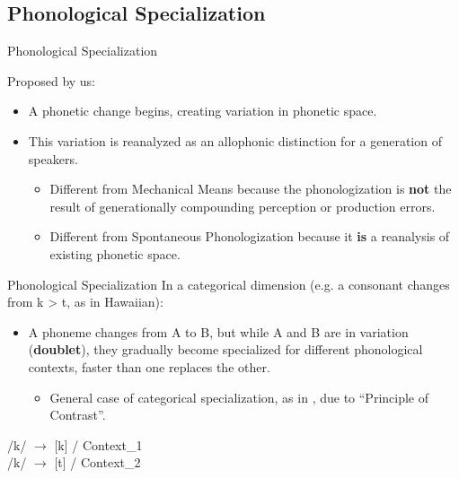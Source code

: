 \documentclass[hyperref={pdfpagelabels=false}]{beamer}
\begin{document}
\subsection{Phonological Specialization}

\begin{frame}{Phonological Specialization}

	Proposed by us: \pause
	\begin{itemize}
		\item A phonetic change begins, creating variation in phonetic space. \pause
		\item This variation is reanalyzed as an allophonic distinction for a generation of speakers. \pause
		\begin{itemize}
				\item Different from Mechanical Means because the phonologization is \textbf{not} the result of generationally compounding perception or production errors. \pause
				\item Different from Spontaneous Phonologization because it \textbf{is} a reanalysis of existing phonetic space.
		\end{itemize}
	\end{itemize}

\end{frame}

\begin{frame}{Phonological Specialization}
	In a categorical dimension (e.g. a consonant changes from k > t, as in Hawaiian):
	\begin{itemize}
		\item A phoneme changes from A to B, but while A and B are in variation (\textbf{doublet}), they gradually become specialized for different phonological contexts, faster than one replaces the other.
		\begin{itemize}
		\item General case of categorical specialization, as in \citet{kroch1994, fruehwaldwallenberg2013, fruehwaldwallenberginprep}, due to ``Principle of Contrast''.
		\end{itemize}
		
	\end{itemize}
	\begin{center}
		/k/ $\rightarrow$ [k] / Context_1\\
		/k/ $\rightarrow$ [t] / Context_2\\
	\end{center}

\end{frame}
\end{document}
